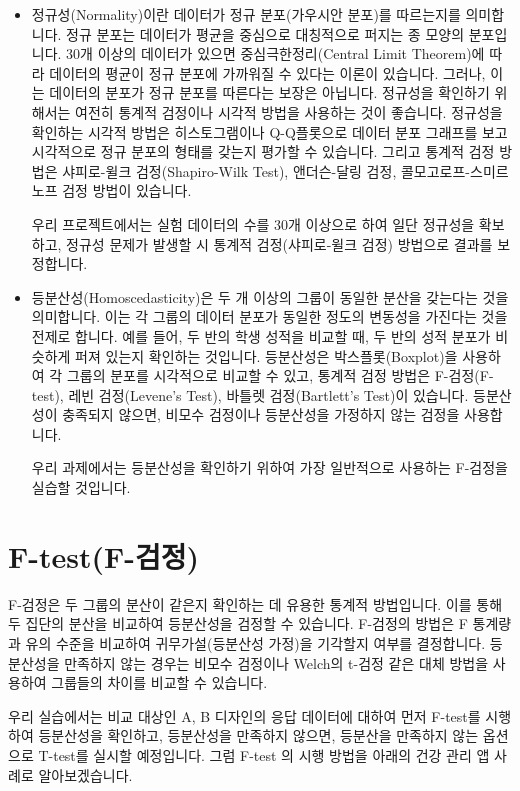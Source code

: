 \documentclass[
  letterpaper,
]{book}
\begin{document}
\begin{itemize}
\item
  정규성(Normality)이란 데이터가 정규 분포(가우시안 분포)를 따르는지를
  의미합니다. 정규 분포는 데이터가 평균을 중심으로 대칭적으로 퍼지는 종
  모양의 분포입니다. 30개 이상의 데이터가 있으면 중심극한정리(Central
  Limit Theorem)에 따라 데이터의 평균이 정규 분포에 가까워질 수 있다는
  이론이 있습니다. 그러나, 이는 데이터의 분포가 정규 분포를 따른다는
  보장은 아닙니다. 정규성을 확인하기 위해서는 여전히 통계적 검정이나
  시각적 방법을 사용하는 것이 좋습니다. 정규성을 확인하는 시각적 방법은
  히스토그램이나 Q-Q플롯으로 데이터 분포 그래프를 보고 시각적으로 정규
  분포의 형태를 갖는지 평가할 수 있습니다. 그리고 통계적 검정 방법은
  샤피로-윌크 검정(Shapiro-Wilk Test), 앤더슨-달링 검정,
  콜모고로프-스미르노프 검정 방법이 있습니다.

  우리 프로젝트에서는 실험 데이터의 수를 30개 이상으로 하여 일단
  정규성을 확보하고, 정규성 문제가 발생할 시 통계적 검정(샤피로-윌크
  검정) 방법으로 결과를 보정합니다.
\item
  등분산성(Homoscedasticity)은 두 개 이상의 그룹이 동일한 분산을
  갖는다는 것을 의미합니다. 이는 각 그룹의 데이터 분포가 동일한 정도의
  변동성을 가진다는 것을 전제로 합니다. 예를 들어, 두 반의 학생 성적을
  비교할 때, 두 반의 성적 분포가 비슷하게 퍼져 있는지 확인하는 것입니다.
  등분산성은 박스플롯(Boxplot)을 사용하여 각 그룹의 분포를 시각적으로
  비교할 수 있고, 통계적 검정 방법은 F-검정(F-test), 레빈 검정(Levene's
  Test), 바틀렛 검정(Bartlett's Test)이 있습니다. 등분산성이 충족되지
  않으면, 비모수 검정이나 등분산성을 가정하지 않는 검정을 사용합니다.

  우리 과제에서는 등분산성을 확인하기 위하여 가장 일반적으로 사용하는
  F-검정을 실습할 것입니다.
\end{itemize}

\section{F-test(F-검정)}\label{f-testf-uxac80uxc815}

F-검정은 두 그룹의 분산이 같은지 확인하는 데 유용한 통계적 방법입니다.
이를 통해 두 집단의 분산을 비교하여 등분산성을 검정할 수 있습니다.
F-검정의 방법은 F 통계량과 유의 수준을 비교하여 귀무가설(등분산성
가정)을 기각할지 여부를 결정합니다. 등분산성을 만족하지 않는 경우는
비모수 검정이나 Welch의 t-검정 같은 대체 방법을 사용하여 그룹들의 차이를
비교할 수 있습니다.

우리 실습에서는 비교 대상인 A, B 디자인의 응답 데이터에 대하여 먼저
F-test를 시행하여 등분산성을 확인하고, 등분산성을 만족하지 않으면,
등분산을 만족하지 않는 옵션으로 T-test를 실시할 예정입니다. 그럼 F-test
의 시행 방법을 아래의 건강 관리 앱 사례로 알아보겠습니다.
\end{document}
